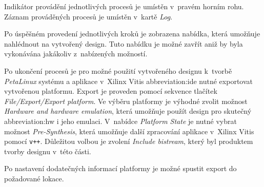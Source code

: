 \documentclass[a4paper, twoside, 11pt]{article}
\begin{document}
\begin{appendices}
		Indikátor provádění jednotlivých procesů je umístěn v~pravém horním rohu. Záznam prováděných procesů je umístěn v~kartě \textit{Log}.\par
		Po úspěšném provedení jednotlivých kroků je zobrazena nabídka, která umožňuje nahlédnout na vytvořený design. Tuto nabídku je možné zavřít aniž by byla vykonávána jakákoliv z~nabízených možností.\par
		Po ukončení procesů je pro možné použití vytvořeného designu k~tvorbě \textit{PetaLinux} systému a aplikace v~Xilinx Vitis \gls{abbreviation:ide} nutné exportovat vytvořenou platformu. Export je proveden pomocí sekvence tlačítek \textit{File/Export/Export platform}. Ve výběru platformy je výhodné zvolit možnost \textit{Hardware and hardware emulation}, která umožňuje použít design pro skutečný \gls{abbreviation:hw} i jeho emulaci. V~nabídce \textit{Platform State} je nutné vybrat možnost \textit{Pre-Synthesis}, která umožňuje další zpracování aplikace v~Xilinx Vitis pomocí \texttt{v++}. Důležitou volbou je zvolení \textit{Include bistream}, který byl produktem tvorby designu v~této části.\par
		Po nastavení dodatečných informací platformy je možné spustit export do požadované lokace.



\end{appendices}
\end{document}
